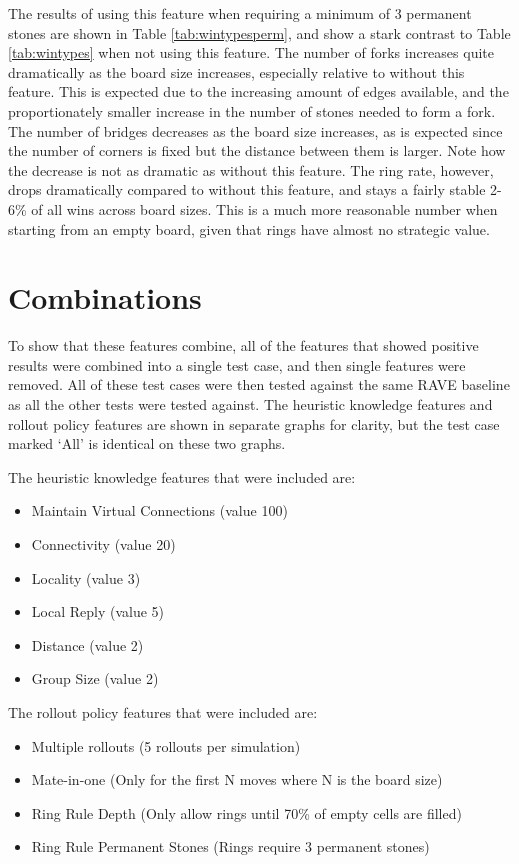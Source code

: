 The results of using this feature when requiring a minimum of 3 permanent stones are shown in Table \ref{tab:wintypesperm}, and show a stark contrast to Table \ref{tab:wintypes} when not using this feature. The number of forks increases quite dramatically as the board size increases, especially relative to without this feature. This is expected due to the increasing amount of edges available, and the proportionately smaller increase in the number of stones needed to form a fork. The number of bridges decreases as the board size increases, as is expected since the number of corners is fixed but the distance between them is larger. Note how the decrease is not as dramatic as without this feature. The ring rate, however, drops dramatically compared to without this feature, and stays a fairly stable 2-6\% of all wins across board sizes. This is a much more reasonable number when starting from an empty board, given that rings have almost no strategic value.

\section{Combinations}

To show that these features combine, all of the features that showed positive results were combined into a single test case, and then single features were removed. All of these test cases were then tested against the same RAVE baseline as all the other tests were tested against. The heuristic knowledge features and rollout policy features are shown in separate graphs for clarity, but the test case marked `All' is identical on these two graphs.

The heuristic knowledge features that were included are:
\begin{itemize}
\item Maintain Virtual Connections (value 100)
\item Connectivity (value 20)
\item Locality (value 3)
\item Local Reply (value 5)
\item Distance (value 2)
\item Group Size (value 2)
\end{itemize}

The rollout policy features that were included are:
\begin{itemize}
\item Multiple rollouts (5 rollouts per simulation)
\item Mate-in-one (Only for the first N moves where N is the board size)
\item Ring Rule Depth (Only allow rings until 70\% of empty cells are filled)
\item Ring Rule Permanent Stones (Rings require 3 permanent stones)
\end{itemize}



